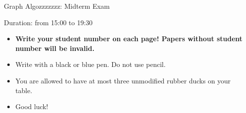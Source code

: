 \documentclass[]{exercises}
\begin{document}
\begin{center}
	{\LARGE Graph Algozzzzzzz: Midterm Exam}

	\vspace{3mm}
	{\large Duration: from 15:00 to 19:30}
\end{center}
\vspace{5mm}

\begin{instructions}
	\begin{itemize}
		\item \textbf{Write your student number on each page! Papers without student number will be invalid.}
		\item Write with a black or blue pen. Do not use pencil.
		\item You are allowed to have at most three unmodified rubber ducks on your table.
		\item Good luck!
	\end{itemize}
\end{instructions}
\end{document}

